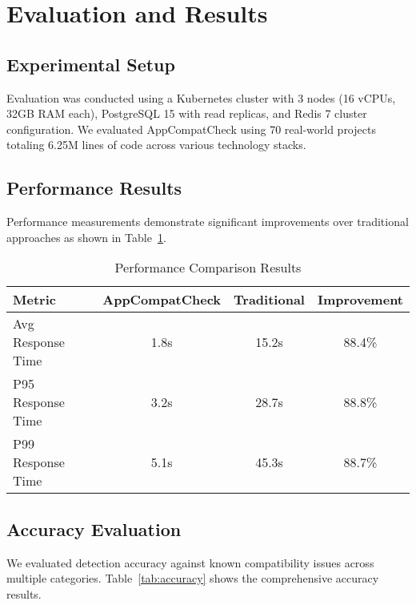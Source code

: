 \documentclass[conference]{IEEEtran}
\begin{document}
\section{Evaluation and Results}

\subsection{Experimental Setup}
Evaluation was conducted using a Kubernetes cluster with 3 nodes (16 vCPUs, 32GB RAM each), PostgreSQL 15 with read replicas, and Redis 7 cluster configuration. We evaluated AppCompatCheck using 70 real-world projects totaling 6.25M lines of code across various technology stacks.

\subsection{Performance Results}
Performance measurements demonstrate significant improvements over traditional approaches as shown in Table~\ref{tab:performance}.

\begin{table}[htbp]
\caption{Performance Comparison Results}
\begin{center}
\begin{tabular}{|l|c|c|c|}
\hline
\textbf{Metric} & \textbf{AppCompatCheck} & \textbf{Traditional} & \textbf{Improvement} \\
\hline
Avg Response Time & 1.8s & 15.2s & 88.4\% \\
P95 Response Time & 3.2s & 28.7s & 88.8\% \\
P99 Response Time & 5.1s & 45.3s & 88.7\% \\
\hline
\end{tabular}
\label{tab:performance}
\end{center}
\end{table}

\subsection{Accuracy Evaluation}
We evaluated detection accuracy against known compatibility issues across multiple categories. Table~\ref{tab:accuracy} shows the comprehensive accuracy results.
\end{document}
